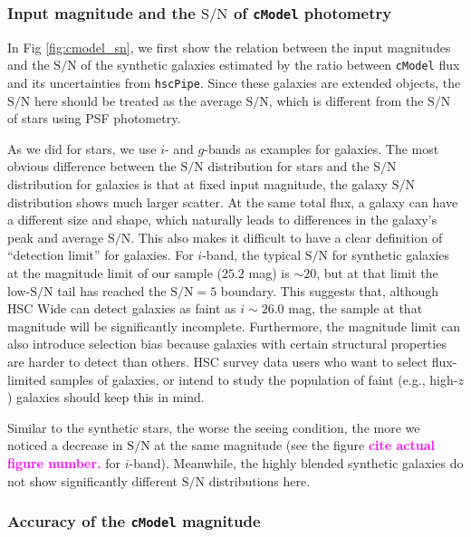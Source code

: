 \documentclass[useamsfonts]{pasj01}
\def\hscpipe{\texttt{hscPipe}}
\def\cmodel{\texttt{cModel}}
\def\s2n{{$\mathrm{S}/\mathrm{N}$}}
\newcommand{\susan}[1]{\textcolor{magenta} {\textbf{#1}}}
\begin{document}
\subsubsection{Input magnitude and the \s2n{} of \cmodel{} photometry}

    In Fig \ref{fig:cmodel_sn}, we first show the relation between the input 
    magnitudes and the \s2n{} of the synthetic galaxies estimated by the ratio 
    between \cmodel{} flux and its uncertainties from \hscpipe{}. 
    Since these galaxies are extended objects, the \s2n{} here should be treated 
    as the average \s2n{}, which is different from the \s2n{} of stars using PSF 
    photometry. 
    
    As we did for stars, we use $i$- and $g$-bands as examples for galaxies. 
    The most obvious difference between the  \s2n{} distribution for stars and the  \s2n{} distribution for galaxies is that
    at fixed input magnitude, the galaxy \s2n{} distribution shows much larger
    scatter.  
    At the same total flux, a galaxy can have a different size and shape, which 
    naturally leads to differences in the galaxy's peak and average \s2n{}.  
    This also makes it difficult to have a clear definition of ``detection limit'' 
    for galaxies. 
    For $i$-band, the typical \s2n{} for synthetic galaxies at the magnitude limit 
    of our sample ($25.2$ mag) is ${\sim}20$, but at that limit the low-\s2n{} tail has  
    reached the \s2n{}$=5$ boundary.  
    This suggests that, although HSC Wide can detect galaxies as faint as 
    $i{\sim}26.0$ mag, the sample at that magnitude will be significantly incomplete. 
    Furthermore, the magnitude limit can also introduce selection bias because galaxies with certain structural properties are harder to detect than others. 
    HSC survey data users who want to select flux-limited samples of galaxies,
    or intend to study the population of faint (e.g., high-$z$) galaxies should
    keep this in mind.  
    
    Similar to the synthetic stars, the worse the seeing condition, the more 
    we noticed a decrease in \s2n{} at the same magnitude (see the figure \susan{cite actual figure number.} for
    $i$-band). 
    Meanwhile, the highly blended synthetic galaxies do not show significantly 
    different \s2n{} distributions here. 

\subsubsection{Accuracy of the \cmodel{} magnitude}
\end{document}
